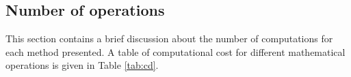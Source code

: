 %

\subsection{Number of operations}%
This section contains a brief discussion about the number of computations for each method presented. A table of computational cost for different mathematical operations is given in Table \ref{tab:cd}.  \\

